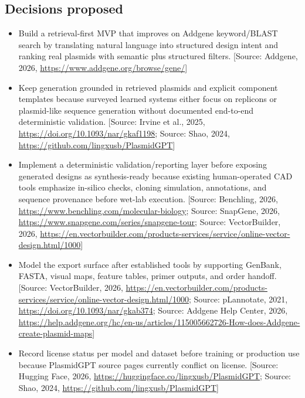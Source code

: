 \documentclass[11pt]{report}
\begin{document}
\subsection{Decisions proposed}
\begin{itemize}
\item Build a retrieval-first MVP that improves on Addgene keyword/BLAST search by translating natural language into structured design intent and ranking real plasmids with semantic plus structured filters. [Source: Addgene, 2026, \url{https://www.addgene.org/browse/gene/}]
\item Keep generation grounded in retrieved plasmids and explicit component templates because surveyed learned systems either focus on replicons or plasmid-like sequence generation without documented end-to-end deterministic validation. [Source: Irvine et al., 2025, \url{https://doi.org/10.1093/nar/gkaf1198}; Source: Shao, 2024, \url{https://github.com/lingxusb/PlasmidGPT}]
\item Implement a deterministic validation/reporting layer before exposing generated designs as synthesis-ready because existing human-operated CAD tools emphasize in-silico checks, cloning simulation, annotations, and sequence provenance before wet-lab execution. [Source: Benchling, 2026, \url{https://www.benchling.com/molecular-biology}; Source: SnapGene, 2026, \url{https://www.snapgene.com/series/snapgene-tour}; Source: VectorBuilder, 2026, \url{https://en.vectorbuilder.com/products-services/service/online-vector-design.html/1000}]
\item Model the export surface after established tools by supporting GenBank, FASTA, visual maps, feature tables, primer outputs, and order handoff. [Source: VectorBuilder, 2026, \url{https://en.vectorbuilder.com/products-services/service/online-vector-design.html/1000}; Source: pLannotate, 2021, \url{https://doi.org/10.1093/nar/gkab374}; Source: Addgene Help Center, 2026, \url{https://help.addgene.org/hc/en-us/articles/115005662726-How-does-Addgene-create-plasmid-maps}]
\item Record license status per model and dataset before training or production use because PlasmidGPT source pages currently conflict on license. [Source: Hugging Face, 2026, \url{https://huggingface.co/lingxusb/PlasmidGPT}; Source: Shao, 2024, \url{https://github.com/lingxusb/PlasmidGPT}]
\end{itemize}
\end{document}
